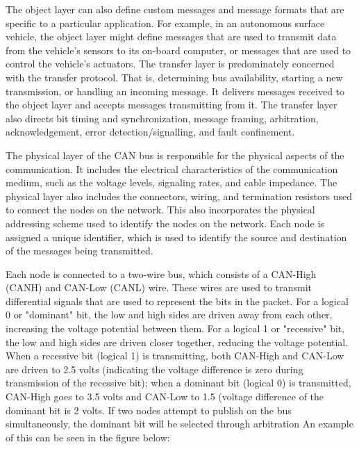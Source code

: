 The object layer can also define custom messages and message formats that are specific to a particular application. 
For example, in an autonomous surface vehicle, the object layer might define messages that are used to transmit data from the vehicle's sensors to its on-board computer, or messages that are used to control the vehicle's actuators.
The transfer layer is predominately concerned with the transfer protocol.
That is, determining bus availability, starting a new transmission, or handling an incoming message. 
It delivers messages received to the object layer and accepts messages transmitting from it. 
The transfer layer also directs bit timing and synchronization, message framing, arbitration, acknowledgement, error detection/signalling, and fault confinement.

The physical layer of the CAN bus is responsible for the physical aspects of the communication. 
It includes the electrical characteristics of the communication medium, such as the voltage levels, signaling rates, and cable impedance. 
The physical layer also includes the connectors, wiring, and termination resistors used to connect the nodes on the network. 
This also incorporates the physical addressing scheme used to identify the nodes on the network. Each node is assigned a unique identifier, which is used to identify the source and destination of the messages being transmitted.

 Each node is connected to a two-wire bus, which consists of a CAN-High (CANH) and CAN-Low (CANL) wire. 
 These wires are used to transmit differential signals that are used to represent the bits in the packet. 
 For a logical 0 or "dominant" bit, the low and high sides are driven away from each other, increasing the voltage potential between them.
 For a logical 1 or "recessive" bit, the low and high sides are driven closer together, reducing the voltage potential. When a recessive bit (logical 1) is transmitting, both CAN-High and CAN-Low are driven to 2.5 volts (indicating the voltage difference is zero during transmission of the recessive bit); when a dominant bit (logical 0) is transmitted, CAN-High goes to 3.5 volts and CAN-Low to 1.5 (voltage difference of the dominant bit is 2 volts. 
 If two nodes attempt to publish on the bus simultaneously, the dominant bit will be selected through arbitration 
 An example of this can be seen in the figure below:
 
